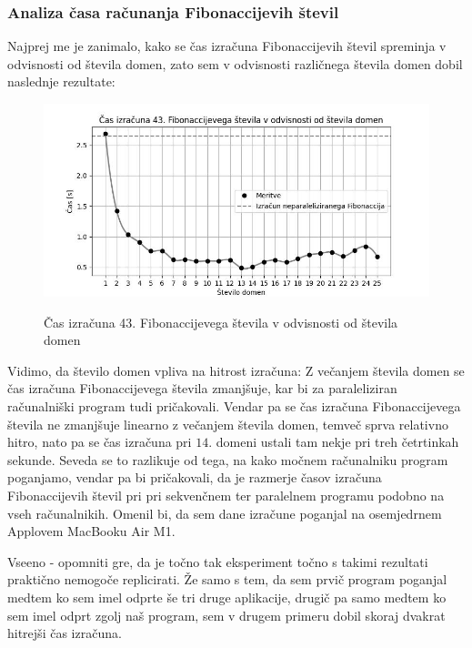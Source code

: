 \documentclass[mat1, tisk]{fmfdelo}
\begin{document}
\subsubsection{Analiza časa računanja Fibonaccijevih števil}

Najprej me je zanimalo, kako se čas izračuna Fibonaccijevih števil spreminja v odvisnosti od števila domen, zato sem
v odvisnosti različnega števila domen dobil naslednje rezultate:

\begin{figure}[h!]
  \centering
  \caption{Čas izračuna 43. Fibonaccijevega števila v odvisnosti od števila domen}
  \includegraphics[width=13cm]{slike/fib_par_v_odvisnosti_od_domen.jpg}
  \label{fig:fib_par_v_odvisnosti_od_domen}
\end{figure}

Vidimo, da število domen vpliva na hitrost izračuna: Z večanjem števila domen se čas izračuna Fibonaccijevega števila
zmanjšuje, kar bi za paraleliziran računalniški program tudi pričakovali. Vendar pa se čas izračuna Fibonaccijevega
števila ne zmanjšuje linearno z večanjem števila domen, temveč sprva relativno hitro, nato pa se čas izračuna pri $14.$
domeni ustali tam nekje pri treh četrtinkah sekunde. Seveda se to razlikuje od tega, na kako močnem računalniku
program poganjamo, vendar pa bi pričakovali, da je razmerje časov izračuna Fibonaccijevih števil pri pri sekvenčnem
ter paralelnem programu podobno na vseh računalnikih. Omenil bi, da sem dane izračune poganjal na osemjedrnem Applovem
MacBooku Air M1. 

Vseeno - opomniti gre, da je točno tak eksperiment točno s takimi rezultati praktično nemogoče replicirati.
Že samo s tem, da sem prvič program poganjal medtem ko sem imel odprte še tri druge aplikacije, 
drugič pa samo medtem ko sem imel odprt zgolj naš program, sem v drugem primeru dobil skoraj dvakrat hitrejši čas izračuna.
\end{document}
